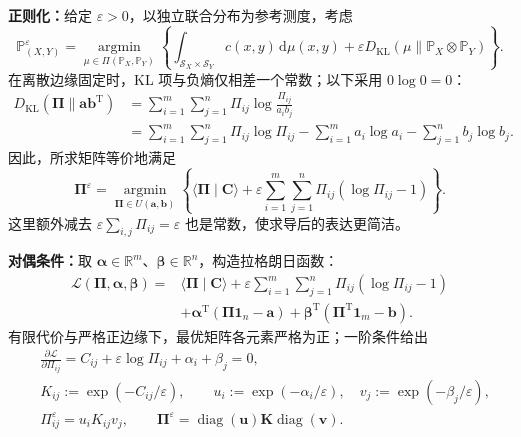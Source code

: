 \textbf{正则化：}给定 $\varepsilon>0$，以独立联合分布为参考测度，考虑
\begin{equation}\label{cw:eq:regularized-measure}
\mathbb P_{(X,Y)}^\varepsilon
=\operatorname*{argmin}_{\mu\in\Pi(\mathbb P_X,\mathbb P_Y)}
\left\{\int_{\mathcal S_X\times\mathcal S_Y} c(x,y)\,\mathrm d\mu(x,y)
+\varepsilon D_{\mathrm{KL}}(\mu\|\mathbb P_X\otimes\mathbb P_Y)\right\}.
\end{equation}
在离散边缘固定时，KL 项与负熵仅相差一个常数；以下采用 $0\log0=0$：
\begin{equation}\label{cw:eq:kl-entropy}
\begin{aligned}
D_{\mathrm{KL}}(\bm\Pi\|\bm a\bm b^{\mathrm T})
&=\sum_{i=1}^m\sum_{j=1}^n\Pi_{ij}\log\frac{\Pi_{ij}}{a_i b_j}\\
&=\sum_{i=1}^m\sum_{j=1}^n\Pi_{ij}\log\Pi_{ij}
-\sum_{i=1}^m a_i\log a_i-\sum_{j=1}^n b_j\log b_j.
\end{aligned}
\end{equation}
因此，所求矩阵等价地满足
\begin{equation}\label{cw:eq:regularized-matrix}
\bm\Pi^\varepsilon
=\operatorname*{argmin}_{\bm\Pi\in U(\bm a,\bm b)}
\left\{\langle\bm\Pi\mid\bm C\rangle
+\varepsilon\sum_{i=1}^m\sum_{j=1}^n\Pi_{ij}(\log\Pi_{ij}-1)\right\}.
\end{equation}
这里额外减去 $\varepsilon\sum_{i,j}\Pi_{ij}=\varepsilon$ 也是常数，使求导后的表达更简洁。

\textbf{对偶条件：}取 $\bm\alpha\in\mathbb R^m$、$\bm\beta\in\mathbb R^n$，构造拉格朗日函数：
\begin{equation}\label{cw:eq:sinkhorn-lagrangian}
\begin{aligned}
\mathcal L(\bm\Pi,\bm\alpha,\bm\beta)
={}&\langle\bm\Pi\mid\bm C\rangle
+\varepsilon\sum_{i=1}^m\sum_{j=1}^n\Pi_{ij}(\log\Pi_{ij}-1)\\
&+\bm\alpha^{\mathrm T}(\bm\Pi\mathbf1_n-\bm a)
+\bm\beta^{\mathrm T}(\bm\Pi^{\mathrm T}\mathbf1_m-\bm b).
\end{aligned}
\end{equation}
有限代价与严格正边缘下，最优矩阵各元素严格为正；一阶条件给出
\begin{equation}\label{cw:eq:sinkhorn-scaling}
\begin{aligned}
&\frac{\partial\mathcal L}{\partial\Pi_{ij}}
=C_{ij}+\varepsilon\log\Pi_{ij}+\alpha_i+\beta_j=0,\\
&K_{ij}:=\exp(-C_{ij}/\varepsilon),\qquad
u_i:=\exp(-\alpha_i/\varepsilon),\quad v_j:=\exp(-\beta_j/\varepsilon),\\
&\Pi_{ij}^\varepsilon=u_iK_{ij}v_j,\qquad
\bm\Pi^\varepsilon=\operatorname{diag}(\bm u)\bm K\operatorname{diag}(\bm v).
\end{aligned}
\end{equation}

